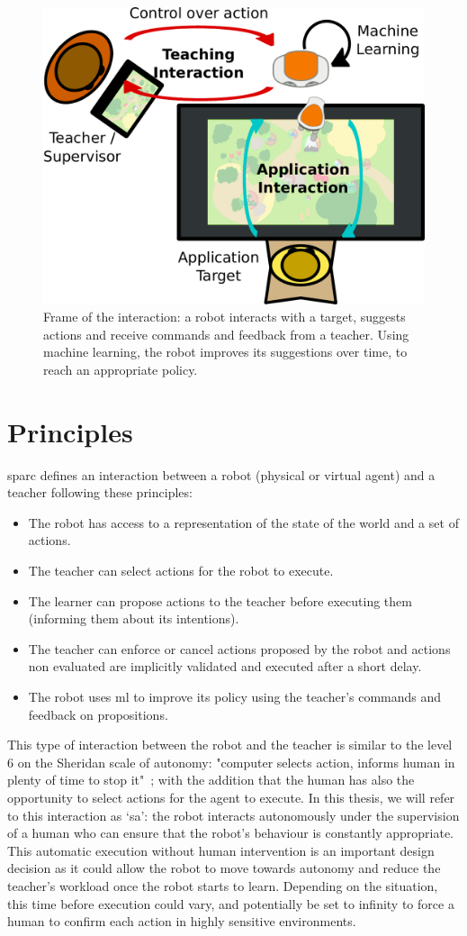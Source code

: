 \begin{figure}[ht]
	\includegraphics[width=.6\linewidth]{setup.pdf}
	\centering
	\caption{Frame of the interaction: a robot interacts with a target, suggests actions and receive commands and feedback from a teacher. Using machine learning, the robot improves its suggestions over time, to reach an appropriate policy.}
	\label{fig:frame}
\end{figure}

\section{Principles} \label{sec:sparc_principles}

\gls{sparc} defines an interaction between a robot (physical or virtual agent) and a teacher following these principles:
\begin{itemize}
	\item The robot has access to a representation of the state of the world and a set of actions.
	\item The teacher can select actions for the robot to execute.
	\item The learner can propose actions to the teacher before executing them (informing them about its intentions).
	\item The teacher can enforce or cancel actions proposed by the robot and actions non evaluated are implicitly validated and executed after a short delay.
	\item The robot uses \gls{ml} to improve its policy using the teacher's commands and feedback on propositions.
\end{itemize} 

This type of interaction between the robot and the teacher is similar to the level 6 on the Sheridan scale of autonomy: "computer selects action, informs human in plenty of time to stop it"~\citep{sheridan1978human}; with the addition that the human has also the opportunity to select actions for the agent to execute. In this thesis, we will refer to this interaction as `\gls{sa}': the robot interacts autonomously under the supervision of a human who can ensure that the robot's behaviour is constantly appropriate. This automatic execution without human intervention is an important design decision as it could allow the robot to move towards autonomy and reduce the teacher's workload once the robot starts to learn. Depending on the situation, this time before execution could vary, and potentially be set to infinity to force a human to confirm each action in highly sensitive environments.

